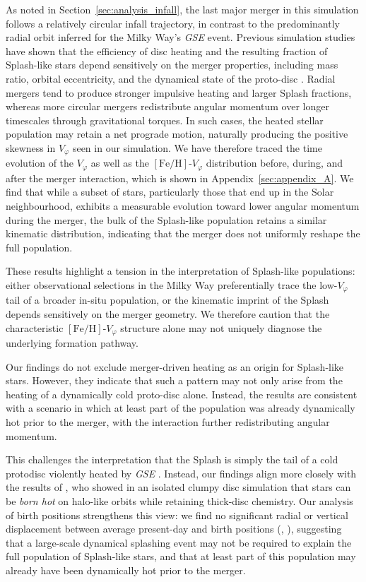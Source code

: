\documentclass[fleqn,usenatbib]{mnras}
\begin{document}
As noted in Section~\ref{sec:analysis_infall}, the last major merger in this simulation follows a relatively circular infall trajectory, in contrast to the predominantly radial orbit inferred for the Milky Way's \textit{GSE} event. Previous simulation studies have shown that the efficiency of disc heating and the resulting fraction of Splash-like stars depend sensitively on the merger properties, including mass ratio, orbital eccentricity, and the dynamical state of the proto-disc \citep[e.g.][]{Grand2020}. Radial mergers tend to produce stronger impulsive heating and larger Splash fractions, whereas more circular mergers redistribute angular momentum over longer timescales through gravitational torques. In such cases, the heated stellar population may retain a net prograde motion, naturally producing the positive skewness in $V_\varphi$ seen in our simulation. We have therefore traced the time evolution of the $V_\varphi$ as well as the $\mathrm{[Fe/H]}$-$V_\varphi$ distribution before, during, and after the merger interaction, which is shown in Appendix~\ref{sec:appendix_A}. We find that while a subset of stars, particularly those that end up in the Solar neighbourhood, exhibits a measurable evolution toward lower angular momentum during the merger, the bulk of the Splash-like population retains a similar kinematic distribution, indicating that the merger does not uniformly reshape the full population.

These results highlight a tension in the interpretation of Splash-like populations: either observational selections in the Milky Way preferentially trace the low-$V_\varphi$ tail of a broader in-situ population, or the kinematic imprint of the Splash depends sensitively on the merger geometry. We therefore caution that the characteristic $\mathrm{[Fe/H]}$-$V_\varphi$ structure alone may not uniquely diagnose the underlying formation pathway.

Our findings do not exclude merger-driven heating as an origin for Splash-like stars. However, they indicate that such a pattern may not only arise from the heating of a dynamically cold proto-disc alone. Instead, the results are consistent with a scenario in which at least part of the population was already dynamically hot prior to the merger, with the interaction further redistributing angular momentum.

This challenges the interpretation that the Splash is simply the tail of a cold protodisc violently heated by \textit{GSE} \citep{DiMatteo2019, Belokurov2020}. Instead, our findings align more closely with the results of \citet{Amarante2020}, who showed in an isolated clumpy disc simulation that stars can be \emph{born hot} on halo-like orbits while retaining thick-disc chemistry. Our analysis of birth positions strengthens this view: we find no significant radial or vertical displacement between average present-day and birth positions (, ), suggesting that a large-scale dynamical splashing event may not be required to explain the full population of Splash-like stars, and that at least part of this population may already have been dynamically hot prior to the merger.
\end{document}
